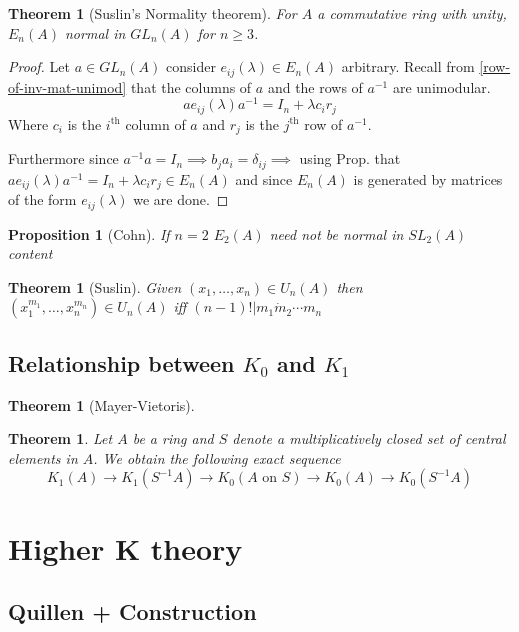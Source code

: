 \documentclass[12pt]{article}
\numberwithin{equation}{section}
\newcounter{dummy} \numberwithin{dummy}{section}
\newtheorem{theorem}[dummy]{Theorem}
\newtheorem{proposition}[dummy]{Proposition}
\begin{document}
	\begin{theorem}[Suslin's Normality theorem]
		For $A$ a commutative ring with unity, $E_n(A)$ normal in $GL_n(A)$ for $n \geq 3$. 
	\end{theorem}
	\begin{proof}
		Let $a \in GL_n(A)$ consider $e_{ij}(\lambda) \in E_n(A)$ arbitrary. Recall from \ref{row-of-inv-mat-unimod} that the columns of $a$ and the rows of $a^{-1}$ are unimodular.
		\[ ae_{ij} (\lambda ) a^{-1}= I_n +\lambda c_i r_j\]
		Where $c_i$ is the $i^\mathrm{th}$ column of $a$ and $r_j$ is the $j^{\mathrm{th}}$ row of $a^{-1}$.
		
		Furthermore since $a^{-1}a=I_n \implies b_ja_i=\delta_{ij} \implies $ using Prop. that $ae_{ij}(\lambda) a^{-1} = I_n + \lambda c_i r_j \in E_n(A)$ and since $E_n(A)$ is generated by matrices of the form $e_{ij}(\lambda )$ we are done.
	\end{proof}
	
	\begin{proposition}[Cohn] If $n=2$ $E_2(A)$ need not be normal in $SL_2(A)$
		content
	\end{proposition}
	
	\begin{theorem}[Suslin]
		Given $(x_1,\dots,x_n) \in U_n(A)$ then $(x_1^{m_1}, \dots, x_n^{m_n}) \in U_n(A)$ iff $(n-1)! | m_1\dot m_2 \cdots m_n$
	\end{theorem}
	
	\subsection{Relationship between $K_0$ and $K_1$}
	\begin{theorem}[Mayer-Vietoris]
	\end{theorem}
	\begin{theorem}
		Let $A$ be a ring and $S$ denote a multiplicatively closed set of central elements in $A$. We obtain the following exact sequence
		\[ K_1(A)  \to K_1(S^{-1}A ) \to K_0(A \text{ on } S) \to K_0(A) \to K_0(S^{-1} A)\]
	\end{theorem}
	
	\section{Higher K theory}
	\subsection{Quillen + Construction}
\end{document}

